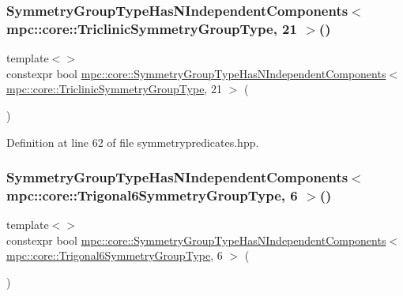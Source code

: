 \subsubsection{\texorpdfstring{Symmetry\+Group\+Type\+Has\+N\+Independent\+Components$<$ mpc\+::core\+::\+Triclinic\+Symmetry\+Group\+Type, 21 $>$()}{SymmetryGroupTypeHasNIndependentComponents< mpc::core::TriclinicSymmetryGroupType, 21 >()}}
{\footnotesize\ttfamily template$<$$>$ \\
constexpr bool \mbox{\hyperlink{namespacempc_1_1core_a4fc1927e7fe7eb577a6bef4ab6bfb4e4}{mpc\+::core\+::\+Symmetry\+Group\+Type\+Has\+N\+Independent\+Components}}$<$ \mbox{\hyperlink{structmpc_1_1core_1_1_triclinic_symmetry_group_type}{mpc\+::core\+::\+Triclinic\+Symmetry\+Group\+Type}}, 21 $>$ (\begin{DoxyParamCaption}{ }\end{DoxyParamCaption})\hspace{0.3cm}{\ttfamily [inline]}}



Definition at line 62 of file symmetrypredicates.\+hpp.

\mbox{\label{namespacempc_1_1core_a5481798f15b70cec912d03a7bbc49bb4}} 
\subsubsection{\texorpdfstring{Symmetry\+Group\+Type\+Has\+N\+Independent\+Components$<$ mpc\+::core\+::\+Trigonal6\+Symmetry\+Group\+Type, 6 $>$()}{SymmetryGroupTypeHasNIndependentComponents< mpc::core::Trigonal6SymmetryGroupType, 6 >()}}
{\footnotesize\ttfamily template$<$$>$ \\
constexpr bool \mbox{\hyperlink{namespacempc_1_1core_a4fc1927e7fe7eb577a6bef4ab6bfb4e4}{mpc\+::core\+::\+Symmetry\+Group\+Type\+Has\+N\+Independent\+Components}}$<$ \mbox{\hyperlink{structmpc_1_1core_1_1_trigonal6_symmetry_group_type}{mpc\+::core\+::\+Trigonal6\+Symmetry\+Group\+Type}}, 6 $>$ (\begin{DoxyParamCaption}{ }\end{DoxyParamCaption})\hspace{0.3cm}{\ttfamily [inline]}}



